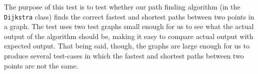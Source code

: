 The purpose of this test is to test whether our path finding algorithm (in the \texttt{Dijkstra} class) finds the correct fastest and shortest paths between two points in a graph. The test uses two test graphs small enough for us to see what the actual output of the algorithm should be, making it easy to compare actual output with expected output. That being said, though, the graphs are large enough for us to produce several test-cases in which the fastest and shortest paths between two points are not the same.

